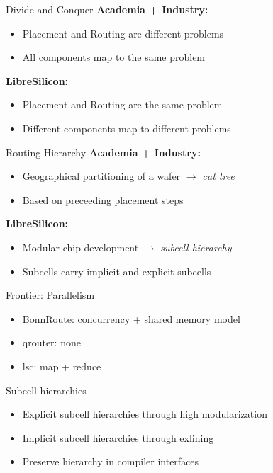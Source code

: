\documentclass[aspectratio=169]{beamer}
\begin{document}
\begin{frame}{Divide and Conquer}
	    \textbf{Academia + Industry:}
	    \begin{itemize}
		\item Placement and Routing are different problems
		\item All components map to the same problem
	    \end{itemize}
	    \textbf{LibreSilicon:}
	    \begin{itemize}
		\item Placement and Routing are the same problem
		\item Different components map to different problems
	    \end{itemize}
\end{frame}

\begin{frame}{Routing Hierarchy}
	    \textbf{Academia + Industry:}
	    \begin{itemize}
		\item Geographical partitioning of a wafer $\rightarrow$ \textit{cut tree}
		\item Based on preceeding placement steps
	    \end{itemize}
	    \textbf{LibreSilicon:}
	    \begin{itemize}
		\item Modular chip development $\rightarrow$ \textit{subcell hierarchy}
		\item Subcells carry implicit and explicit subcells
	    \end{itemize}
\end{frame}

\begin{frame}{Frontier: Parallelism}
	\begin{itemize}
        \setlength\itemsep{1em}
		\item BonnRoute: concurrency + shared memory model
		\item qrouter: none 
		\item lsc: map + reduce
	\end{itemize}
\end{frame}

\begin{frame}{Subcell hierarchies}
	\begin{itemize}
        \setlength\itemsep{1em}
		\item Explicit subcell hierarchies through high modularization
		\item Implicit subcell hierarchies through exlining
		\item Preserve hierarchy in compiler interfaces
	\end{itemize}
\end{frame}
\end{document}
